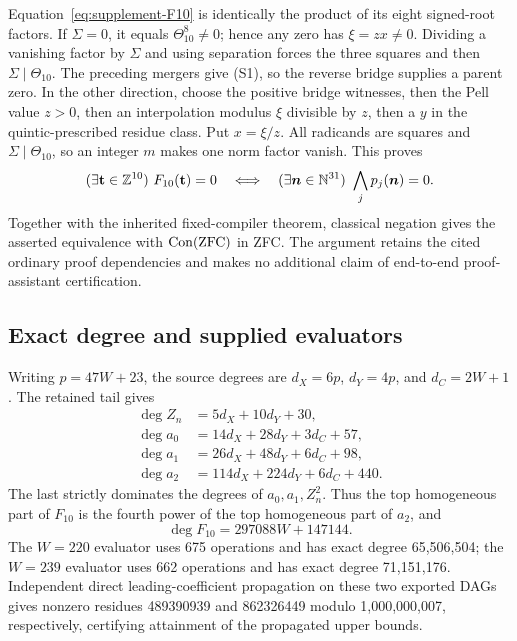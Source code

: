 Equation~\eqref{eq:supplement-F10} is identically the product of its
eight signed-root factors.  If $\Sigma=0$, it equals
$\Theta_{10}^8\ne0$; hence any zero has $\xi=zx\ne0$.  Dividing a
vanishing factor by $\Sigma$ and using separation forces the three
squares and then $\Sigma\mid\Theta_{10}$.  The preceding mergers
give (S1), so the reverse bridge supplies a parent zero.  In the
other direction, choose the positive bridge witnesses, then the Pell
value $z>0$, then an interpolation modulus $\xi$ divisible by $z$,
then a $y$ in the quintic-prescribed residue class.  Put $x=\xi/z$.
All radicands are squares and $\Sigma\mid\Theta_{10}$, so an integer
$m$ makes one norm factor vanish.  This proves
\[
 (\exists\mathbf t\in\mathbb Z^{10})\ F_{10}(\mathbf t)=0
 \quad\Longleftrightarrow\quad
 (\exists\boldsymbol n\in\mathbb N^{31})\ \bigwedge_j p_j(\boldsymbol n)=0.
\]
Together with the inherited fixed-compiler theorem, classical negation
gives the asserted equivalence with $\operatorname{Con}(\mathrm{ZFC})$ in ZFC.  The argument
retains the cited ordinary proof dependencies and makes no additional
claim of end-to-end proof-assistant certification.

\subsection{Exact degree and supplied evaluators}

Writing $p=47W+23$, the source degrees are
$d_X=6p$, $d_Y=4p$, and $d_C=2W+1$.  The retained tail gives
\begin{align*}
 \deg Z_n&=5d_X+10d_Y+30,\\
 \deg a_0&=14d_X+28d_Y+3d_C+57,\\
 \deg a_1&=26d_X+48d_Y+6d_C+98,\\
 \deg a_2&=114d_X+224d_Y+6d_C+440.
\end{align*}
The last strictly dominates the degrees of $a_0,a_1,Z_n^2$.
Thus the top homogeneous part of $F_{10}$ is the fourth power of the
top homogeneous part of $a_2$, and
\[
 \deg F_{10}=297088W+147144.
\]
The $W=220$ evaluator uses 675 operations and has exact degree
65,506,504; the $W=239$ evaluator uses 662 operations and has exact
degree 71,151,176.  Independent direct leading-coefficient propagation
on these two exported DAGs gives nonzero residues 489390939 and
862326449 modulo 1,000,000,007, respectively, certifying attainment of
the propagated upper bounds.
